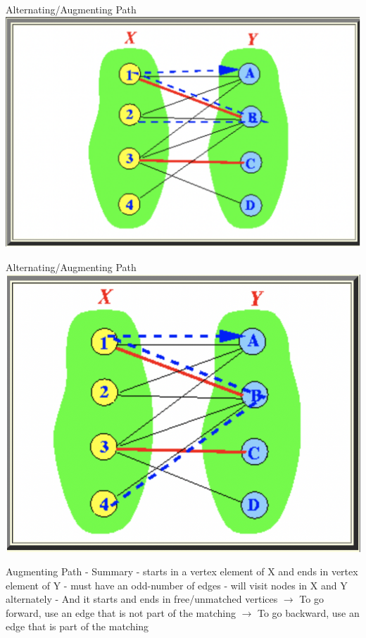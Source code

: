 \begin{frame}{Alternating/Augmenting Path}
\centering
\includegraphics[width=.8
\linewidth]{img/bipartite/alternating2.png}
  
\end{frame}

\begin{frame}{Alternating/Augmenting Path}
\centering
\includegraphics[width=.8\linewidth]{img/bipartite/alternating3.png}
  
\end{frame}

\begin{frame}{Augmenting Path - Summary}
- starts in a vertex element of X and ends in vertex element of Y\newline
- must have an odd-number of edges\newline
- will visit nodes in X and Y alternately\newline
- And it starts and ends in free/unmatched vertices\newline
\newline
$\rightarrow$ To go forward, use an edge that is not part of the matching\newline
$\rightarrow$ To go backward, use an edge that is part of the matching\newline
  
\end{frame}

